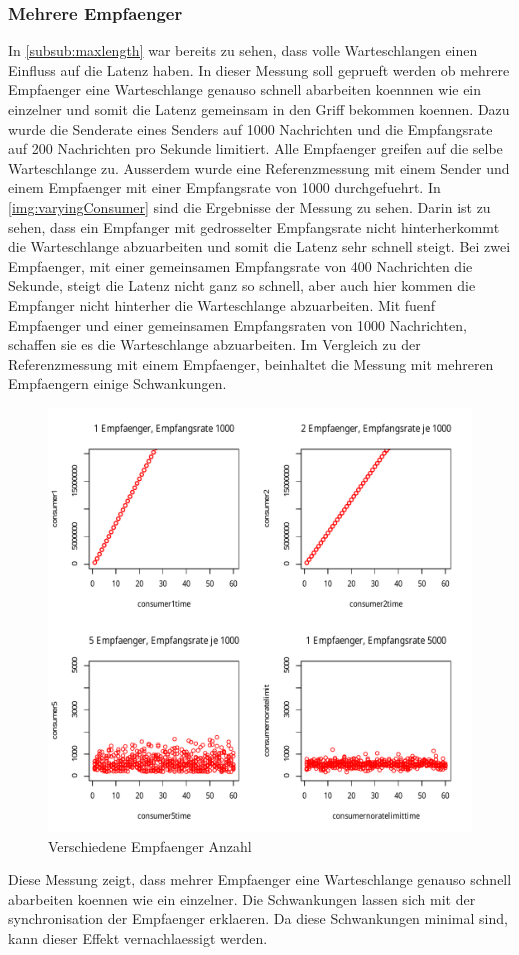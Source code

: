 \subsubsection{Mehrere Empfaenger}
In \autoref{subsub:maxlength} war bereits zu sehen, dass volle Warteschlangen einen Einfluss auf die Latenz haben. In dieser Messung soll geprueft werden ob mehrere Empfaenger eine Warteschlange genauso schnell abarbeiten koennnen wie ein einzelner und somit die Latenz gemeinsam in den Griff bekommen koennen. Dazu wurde die Senderate eines Senders auf 1000 Nachrichten und die Empfangsrate auf 200 Nachrichten pro Sekunde limitiert. Alle Empfaenger greifen auf die selbe Warteschlange zu. Ausserdem wurde eine Referenzmessung mit einem Sender und einem Empfaenger mit einer Empfangsrate von 1000 durchgefuehrt.
In \autoref{img:varyingConsumer} sind die Ergebnisse der Messung zu sehen. Darin ist zu sehen, dass ein Empfanger mit gedrosselter Empfangsrate nicht hinterherkommt die Warteschlange abzuarbeiten und somit die Latenz sehr schnell steigt. Bei zwei Empfaenger, mit einer gemeinsamen Empfangsrate von 400 Nachrichten die Sekunde, steigt die Latenz nicht ganz so schnell, aber auch hier kommen die Empfanger nicht hinterher die Warteschlange abzuarbeiten. Mit fuenf Empfaenger und einer gemeinsamen Empfangsraten von 1000 Nachrichten, schaffen sie es die Warteschlange abzuarbeiten. Im Vergleich zu der Referenzmessung mit einem Empfaenger, beinhaltet die Messung mit mehreren Empfaengern einige Schwankungen.
\begin{figure}
\center
  \includegraphics[width=1\textwidth]{images/measurement/varying-consumer.pdf}
  \caption{Verschiedene Empfaenger Anzahl}
  \label{img:varyingConsumer}
\end{figure}
Diese Messung zeigt, dass mehrer Empfaenger eine Warteschlange genauso schnell abarbeiten koennen wie ein einzelner. Die Schwankungen lassen sich mit der synchronisation der Empfaenger erklaeren. Da diese Schwankungen minimal sind, kann dieser Effekt vernachlaessigt werden.

